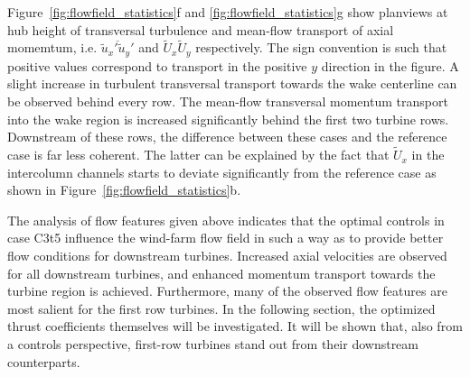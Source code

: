 \documentclass[wes, manuscript]{copernicus}
\begin{document}
Figure~\ref{fig:flowfield_statistics}f and \ref{fig:flowfield_statistics}g show planviews at hub height of transversal turbulence and mean-flow transport of axial momemtum, i.e. $\overline{\widetilde{u}_x' \widetilde{u}_y'}$ and $\widetilde{U}_x \widetilde{U}_y$ respectively. The sign convention is such that positive values correspond to transport in the positive $y$ direction in the figure. A slight increase in turbulent transversal transport towards the wake centerline can be observed behind every row. The mean-flow transversal momentum transport into the wake region is increased significantly behind the first two turbine rows. Downstream of these rows, the difference between these cases and the reference case is far less coherent. The latter can be explained by the fact that $\widetilde{U}_x$ in the intercolumn channels starts to deviate significantly from the reference case as shown in Figure~\ref{fig:flowfield_statistics}b. 

The analysis of flow features given above indicates that the optimal controls in case C3t5 influence the wind-farm flow field in such a way as to provide better flow conditions for downstream turbines. Increased axial velocities are observed for all downstream turbines, and enhanced momentum transport towards the turbine region is achieved. Furthermore, many of the observed flow features are most salient for the first row turbines. In the following section, the optimized thrust coefficients themselves will be investigated. It will be shown that, also from a controls perspective, first-row turbines stand out from their downstream counterparts.
\end{document}
